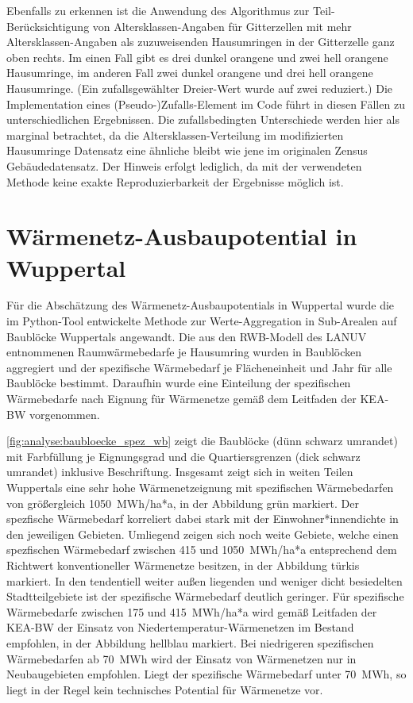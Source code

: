 		Ebenfalls zu erkennen ist die Anwendung des Algorithmus zur Teil-Berücksichtigung von Altersklassen-Angaben für Gitterzellen mit mehr Altersklassen-Angaben als zuzuweisenden Hausumringen in der Gitterzelle ganz oben rechts. Im einen Fall gibt es drei dunkel orangene und zwei hell orangene Hausumringe, im anderen Fall zwei dunkel orangene und drei hell orangene Hausumringe. (Ein zufallsgewählter Dreier-Wert wurde auf zwei reduziert.) Die Implementation eines (Pseudo-)Zufalls-Element im Code führt in diesen Fällen zu unterschiedlichen Ergebnissen. Die zufallsbedingten Unterschiede werden hier als marginal betrachtet, da die Altersklassen-Verteilung im modifizierten Hausumringe Datensatz eine ähnliche bleibt wie jene im originalen Zensus Gebäudedatensatz. Der Hinweis erfolgt lediglich, da mit der verwendeten Methode keine exakte Reproduzierbarkeit der Ergebnisse möglich ist. 
		
	\section{Wärmenetz-Ausbaupotential in Wuppertal}
		Für die Abschätzung des Wärmenetz-Ausbaupotentials in Wuppertal wurde die im Python-Tool entwickelte Methode zur Werte-Aggregation in Sub-Arealen auf Baublöcke Wuppertals angewandt. Die aus den RWB-Modell des LANUV entnommenen Raumwärmebedarfe je Hausumring wurden in Baublöcken aggregiert und der spezifische Wärmebedarf je Flächeneinheit und Jahr für alle Baublöcke bestimmt. Daraufhin wurde eine Einteilung der spezifischen Wärmebedarfe nach Eignung für Wärmenetze gemäß dem Leitfaden der KEA-BW vorgenommen. \cite{kea_bw_leitfaden_waermeplanung} 
		
		\autoref{fig:analyse:baubloecke_spez_wb} zeigt die Baublöcke (dünn schwarz umrandet) mit Farbfüllung je Eignungsgrad und die Quartiersgrenzen (dick schwarz umrandet) inklusive Beschriftung. Insgesamt zeigt sich in weiten Teilen Wuppertals eine sehr hohe Wärmenetzeignung mit spezifischen Wärmebedarfen von größergleich 1050~MWh/ha*a, in der Abbildung grün markiert. Der spezfische Wärmebedarf korreliert dabei stark mit der Einwohner*innendichte in den jeweiligen Gebieten. Umliegend zeigen sich noch weite Gebiete, welche einen spezfischen Wärmebedarf zwischen 415 und 1050~MWh/ha*a entsprechend dem Richtwert konventioneller Wärmenetze besitzen, in der Abbildung türkis markiert. In den tendentiell weiter außen liegenden und weniger dicht besiedelten Stadtteilgebiete ist der spezifische Wärmebedarf deutlich geringer. Für spezifische Wärmebedarfe zwischen 175 und 415~MWh/ha*a wird gemäß Leitfaden der KEA-BW der Einsatz von Niedertemperatur-Wärmenetzen im Bestand empfohlen, in der Abbildung hellblau markiert. Bei niedrigeren spezifischen Wärmebedarfen ab 70~MWh wird der Einsatz von Wärmenetzen nur in Neubaugebieten empfohlen. Liegt der spezifische Wärmebedarf unter 70~MWh, so liegt in der Regel kein technisches Potential für Wärmenetze vor.
				
